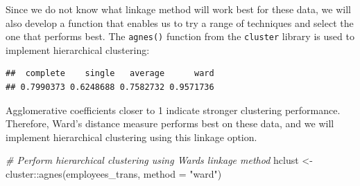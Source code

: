 \documentclass[
]{book}
\newenvironment{Shaded}{\begin{snugshade}}{\end{snugshade}}
\newcommand{\AttributeTok}[1]{\textcolor[rgb]{0.77,0.63,0.00}{#1}}
\newcommand{\CommentTok}[1]{\textcolor[rgb]{0.56,0.35,0.01}{\textit{#1}}}
\newcommand{\ControlFlowTok}[1]{\textcolor[rgb]{0.13,0.29,0.53}{\textbf{#1}}}
\newcommand{\FunctionTok}[1]{\textcolor[rgb]{0.00,0.00,0.00}{#1}}
\newcommand{\NormalTok}[1]{#1}
\newcommand{\OtherTok}[1]{\textcolor[rgb]{0.56,0.35,0.01}{#1}}
\newcommand{\SpecialCharTok}[1]{\textcolor[rgb]{0.00,0.00,0.00}{#1}}
\newcommand{\StringTok}[1]{\textcolor[rgb]{0.31,0.60,0.02}{#1}}
\begin{document}
Since we do not know what linkage method will work best for these data, we will also develop a function that enables us to try a range of techniques and select the one that performs best. The \texttt{agnes()} function from the \texttt{cluster} library is used to implement hierarchical clustering:

\begin{Shaded}
\end{Shaded}

\begin{verbatim}
##  complete    single   average      ward 
## 0.7990373 0.6248688 0.7582732 0.9571736
\end{verbatim}

Agglomerative coefficients closer to 1 indicate stronger clustering performance. Therefore, Ward's distance measure performs best on these data, and we will implement hierarchical clustering using this linkage option.

\begin{Shaded}
\begin{Highlighting}[]
\CommentTok{\# Perform hierarchical clustering using Ward\textquotesingle{}s linkage method}
\NormalTok{hclust }\OtherTok{\textless{}{-}}\NormalTok{ cluster}\SpecialCharTok{::}\FunctionTok{agnes}\NormalTok{(employees\_trans, }\AttributeTok{method =} \StringTok{"ward"}\NormalTok{)}
\end{Highlighting}
\end{Shaded}
\end{document}
